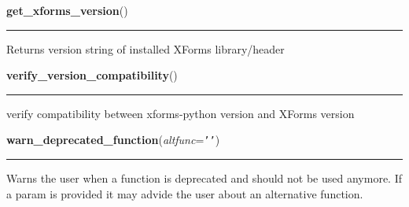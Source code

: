     \vspace{0.5ex}

\hspace{.8\funcindent}\begin{boxedminipage}{\funcwidth}

    \raggedright \textbf{get\_xforms\_version}()

    \vspace{-1.5ex}

    \rule{\textwidth}{0.5\fboxrule}
\setlength{\parskip}{2ex}
    Returns version string of installed XForms library/header

\setlength{\parskip}{1ex}
    \end{boxedminipage}

    \label{xformslib:library:verify_version_compatibility}

    \vspace{0.5ex}

\hspace{.8\funcindent}\begin{boxedminipage}{\funcwidth}

    \raggedright \textbf{verify\_version\_compatibility}()

    \vspace{-1.5ex}

    \rule{\textwidth}{0.5\fboxrule}
\setlength{\parskip}{2ex}
    verify compatibility between xforms-python version and XForms version

\setlength{\parskip}{1ex}
    \end{boxedminipage}

    \label{xformslib:library:warn_deprecated_function}

    \vspace{0.5ex}

\hspace{.8\funcindent}\begin{boxedminipage}{\funcwidth}

    \raggedright \textbf{warn\_deprecated\_function}(\textit{altfunc}={\tt \texttt{'}\texttt{}\texttt{'}})

    \vspace{-1.5ex}

    \rule{\textwidth}{0.5\fboxrule}
\setlength{\parskip}{2ex}
    Warns the user when a function is deprecated and should not be used 
    anymore. If a param is provided it may advide the user about an 
    alternative function.

\setlength{\parskip}{1ex}
    \end{boxedminipage}

